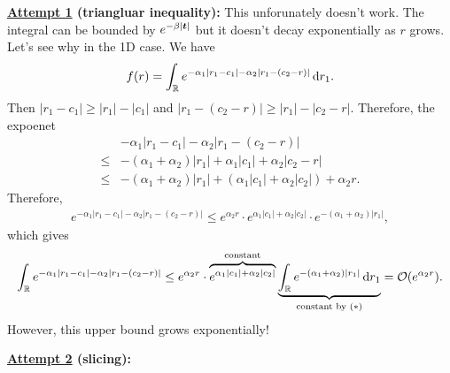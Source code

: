 \documentclass[12pt]{article}
\begin{document}
\textbf{\underline{Attempt 1} (triangluar inequality):} This unforunately doesn't work. The integral can be bounded by \(e^{-\beta|\bm{t}|}\) but it doesn't decay exponentially as \(r\) grows. Let's see why in the 1D case. We have
\begin{align*}
    f(r) = \int_{\mathbb {R}} e^{-\alpha_1|r_1 - c_1| - \alpha_2 |r_1 - (c_2 - r)| } \mathop{}\!\mathrm{d} r_1.
\end{align*}
Then \(|r_1 - c_1| \geq |r_1| - |c_1|\) and \(|r_1 - (c_2 - r)| \geq |r_1| - |c_2 - r|\).
Therefore, the expoenet
\begin{align*}
    &-\alpha_1|r_1 - c_1| - \alpha_2 |r_1 - (c_2 - r)| \\
    \leq& -(\alpha_1 + \alpha_2)|r_1| + \alpha_1|c_1| + \alpha_2|c_2 - r|  \\
    \leq& -(\alpha_1 + \alpha_2)|r_1| + (\alpha_1|c_1| + \alpha_2|c_2|) + \alpha_2 r.
\end{align*}
Therefore,
\begin{align*}
    e^{-\alpha_1|r_1 - c_1| - \alpha_2 |r_1 - (c_2 - r)|} \leq e^{\alpha_2 r} \cdot e^{\alpha_1|c_1| + \alpha_2|c_2|}\cdot e^{-(\alpha_1 + \alpha_2)|r_1|},
\end{align*}
which gives
\begin{align*}
    \int_{\mathbb {R}}  e^{-\alpha_1|r_1 - c_1| - \alpha_2 |r_1 - (c_2 - r)|} 
    \leq 
    e^{\alpha_2 r} 
    \cdot 
    \overbrace{e^{\alpha_1|c_1| + \alpha_2|c_2|}}^{\text{constant}} 
    \underbrace{\int_{\mathbb {R}} e^{-(\alpha_1 + \alpha_2)|r_1|} \mathop{}\!\mathrm{d} r_1}_{\text{constant by }(\ast)} = \mathcal{O}(e^{\alpha_2r}).
\end{align*}
However, this upper bound grows exponentially!

\textbf{\underline{Attempt 2} (slicing):} 
\end{document}
